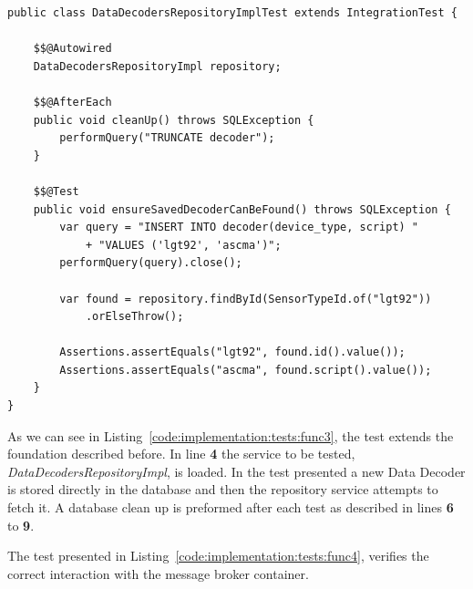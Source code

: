 \begin{lstlisting}[style=Java, caption=Functional Test - Database Interaction - Data Decoder Backend, label={code:implementation:tests:func3}]
public class DataDecodersRepositoryImplTest extends IntegrationTest {

    $$@Autowired
    DataDecodersRepositoryImpl repository;

    $$@AfterEach
    public void cleanUp() throws SQLException {
        performQuery("TRUNCATE decoder");
    }

    $$@Test
    public void ensureSavedDecoderCanBeFound() throws SQLException {
        var query = "INSERT INTO decoder(device_type, script) "
            + "VALUES ('lgt92', 'ascma')";
        performQuery(query).close();

        var found = repository.findById(SensorTypeId.of("lgt92"))
            .orElseThrow();

        Assertions.assertEquals("lgt92", found.id().value());
        Assertions.assertEquals("ascma", found.script().value());
    }
}
\end{lstlisting}

As we can see in Listing~\ref{code:implementation:tests:func3}, the test extends the foundation described before. In line \textbf{4} the service to be tested, \textit{DataDecodersRepositoryImpl}, is loaded. In the test presented a new Data Decoder is stored directly in the database and then the repository service attempts to fetch it. A database clean up is preformed after each test as described in lines \textbf{6} to \textbf{9}.

The test presented in Listing~\ref{code:implementation:tests:func4}, verifies the correct interaction with the message broker container.

